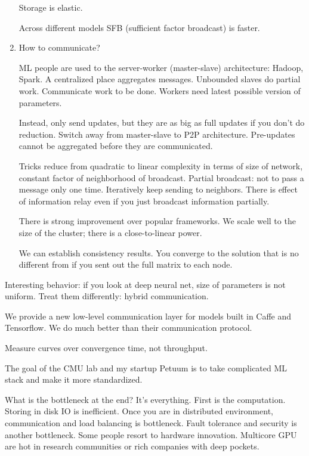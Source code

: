 \begin{enumerate}
Storage is elastic. 

Across different models SFB (sufficient factor broadcast) is faster. %
\item 
How to communicate?

ML people are used to the server-worker (master-slave) architecture: Hadoop, Spark. A centralized place aggregates messages. Unbounded slaves do partial work. Communicate work to be done. Workers need latest possible version of parameters.

Instead, only send updates, but they are as big as full updates if you don't do reduction. 
Switch away from master-slave to P2P architecture. Pre-updates cannot be aggregated before they are communicated.

Tricks reduce from quadratic to linear complexity in terms of size of network, constant factor of neighborhood of broadcast. Partial broadcast: not to pass a message only one time. Iteratively keep sending to neighbors.  There is effect of information relay even if you just broadcast information partially. %

There is strong improvement over popular frameworks. We scale well to the size of the cluster; there is a close-to-linear power.

We can establish consistency results. You converge to the solution that is no different from if you sent out the full matrix to each node. 
\end{enumerate}

Interesting behavior: if you look at deep neural net, size of parameters is not uniform. %
Treat them differently: hybrid communication. 

We provide a new low-level communication layer for models built in Caffe and Tensorflow. We do much better than their communication protocol.

Measure curves over convergence time, not throughput.


The goal of the CMU lab and my startup Petuum is to take complicated ML stack and make it more standardized. 

What is the bottleneck at the end? It's everything. First is the computation. Storing in disk IO is inefficient. Once you are in distributed environment, communication and load balancing is bottleneck. Fault tolerance and security is another bottleneck. 
Some people resort to hardware innovation. Multicore GPU are hot in research communities or rich companies with deep pockets.

